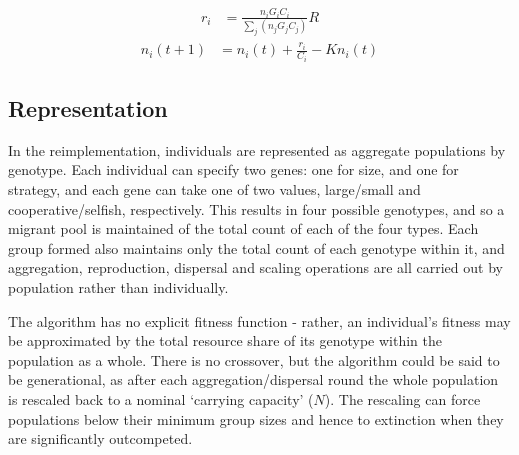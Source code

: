 \documentclass[11pt]{article}
\begin{document}
\begin{align} \label{eq:desire}
  r_i &= \frac{n_iG_iC_i}{\sum\limits_{j}(n_jG_jC_j)}R
\end{align}
\begin{align} \label{eq:shares}
  n_i(t+1) &= n_i(t) + \frac{r_i}{C_i} - Kn_i(t)
\end{align}

\subsection{Representation}
In the reimplementation, individuals are represented as aggregate populations by genotype. Each individual can specify two genes: one for size, and one for strategy, and each gene can take one of two values, large/small and cooperative/selfish, respectively. This results in four possible genotypes, and so a migrant pool is maintained of the total count of each of the four types. Each group formed also maintains only the total count of each genotype within it, and aggregation, reproduction, dispersal and scaling operations are all carried out by population rather than individually.


The algorithm has no explicit fitness function - rather, an individual's fitness may be approximated by the total resource share of its genotype within the population as a whole. There is no crossover, but the algorithm could be said to be generational, as after each aggregation/dispersal round the whole population is rescaled back to a nominal `carrying capacity' ($N$). The rescaling can force populations below their minimum group sizes and hence to extinction when they are significantly outcompeted.\\
\newpage
\end{document}
